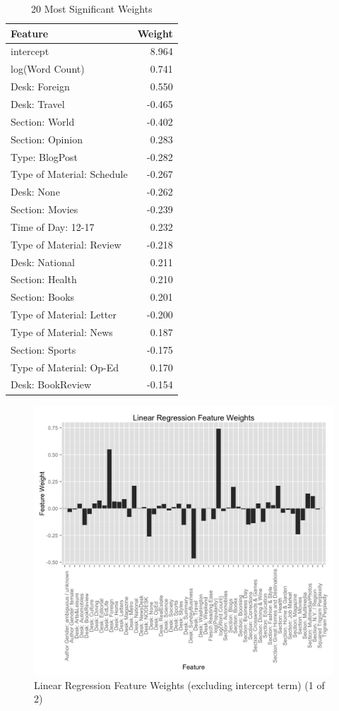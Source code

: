 \documentclass[fleqn,12pt]{SelfArx} %
\begin{document}
\begin{table}[hbt]
\caption{20 Most Significant Weights}
\centering
\begin{tabular}{lr}
\toprule
Feature  &  Weight\\
\midrule
intercept & 8.964\\
log(Word Count) & 0.741\\
Desk: Foreign & 0.550\\
Desk: Travel & -0.465\\
Section: World & -0.402\\
Section: Opinion & 0.283\\
Type: BlogPost & -0.282\\
Type of Material: Schedule & -0.267\\
Desk: None & -0.262\\
Section: Movies & -0.239\\
Time of Day: 12-17 & 0.232\\
Type of Material: Review & -0.218\\
Desk: National & 0.211\\
Section: Health & 0.210\\
Section: Books & 0.201\\
Type of Material: Letter & -0.200\\
Type of Material: News & 0.187\\
Section: Sports & -0.175\\
Type of Material: Op-Ed & 0.170\\
Desk: BookReview & -0.154\\
\bottomrule
\end{tabular}
\end{table}

\begin{figure}[ht]\centering
\includegraphics[width=\linewidth]{feature_weights.png}
\caption{Linear Regression Feature Weights (excluding intercept term) (1 of 2)}
\label{fig:lin_reg_weights1}
\end{figure}
\end{document}
